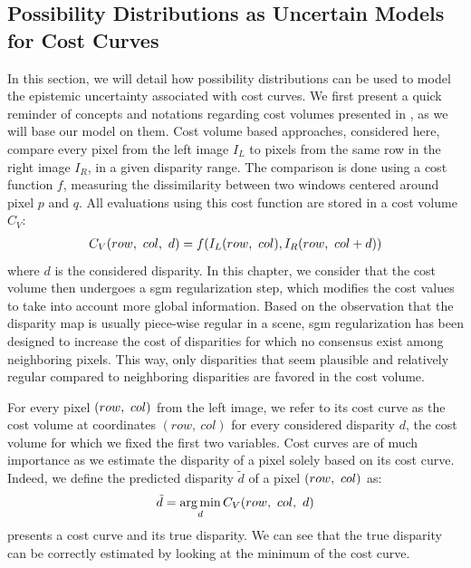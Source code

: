 \subsection{Possibility Distributions as Uncertain Models for Cost Curves}
In this section, we will detail how possibility distributions can be used to model the epistemic uncertainty associated with cost curves. We first present a quick reminder of concepts and notations regarding cost volumes presented in , as we will base our model on them. Cost volume based approaches, considered here, compare every pixel from the left image $I_L$ to pixels from the same row in the right image $I_R$, in a given disparity range. The comparison is done using a cost function $f$, measuring the dissimilarity between two windows centered around pixel $p$ and $q$. All evaluations using this cost function are stored in a cost volume $C_V$:
\begin{align}
	C_V(row, ~col, ~d) = f(I_L(row, ~col), I_R(row, ~col+d))
\end{align}
where $d$ is the considered disparity. In this chapter, we consider that the cost volume then undergoes a \acrshort{sgm} regularization step, which modifies the cost values to take into account more global information. Based on the observation that the disparity map is usually piece-wise regular in a scene, \acrshort{sgm} regularization has been designed to increase the cost of disparities for which no consensus exist among neighboring pixels. This way, only disparities that seem plausible and relatively regular compared to neighboring disparities are favored in the cost volume.

For every pixel $(row, ~col)$ from the left image, we refer to its cost curve as the cost volume at coordinates $(row,~col)$ for every considered disparity $d$, \ie the cost volume for which we fixed the first two variables. Cost curves are of much importance as we estimate the disparity of a pixel solely based on its cost curve. Indeed, we define the predicted disparity $\tilde{d}$ of a pixel $(row, ~col)$ as:
\begin{align}
	\tilde{d} = \operatorname*{arg\,min}_d C_V(row, ~col, ~d)
\end{align} 
 presents a cost curve and its true disparity. We can see that the true disparity can be correctly estimated by looking at the minimum of the cost curve.

